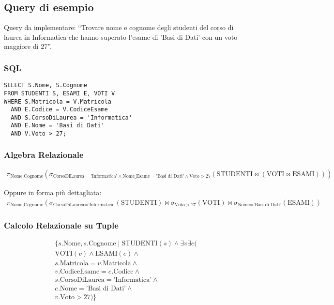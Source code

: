 \subsection{Query di esempio}
Query da implementare: ``Trovare nome e cognome degli studenti del corso di laurea in Informatica che hanno superato l'esame di 'Basi di Dati' con un voto maggiore di 27''.

\subsubsection{SQL}
\begin{verbatim}
SELECT S.Nome, S.Cognome
FROM STUDENTI S, ESAMI E, VOTI V
WHERE S.Matricola = V.Matricola
  AND E.Codice = V.CodiceEsame
  AND S.CorsoDiLaurea = 'Informatica'
  AND E.Nome = 'Basi di Dati'
  AND V.Voto > 27;
\end{verbatim}

\subsubsection{Algebra Relazionale}
\begin{align}
\pi_{\text{Nome}, \text{Cognome}} \left(
  \sigma_{\text{CorsoDiLaurea} = \text{'Informatica'} \wedge \text{Nome\_Esame} = \text{'Basi di Dati'} \wedge \text{Voto} > 27} \left(
    \text{STUDENTI} \bowtie (\text{VOTI} \bowtie \text{ESAMI})
  \right)
\right)
\end{align}

Oppure in forma più dettagliata:
\begin{align}
\pi_{\text{Nome}, \text{Cognome}} \left(
  \sigma_{\text{CorsoDiLaurea} = \text{'Informatica'}} (\text{STUDENTI}) \bowtie 
  \sigma_{\text{Voto} > 27} (\text{VOTI}) \bowtie 
  \sigma_{\text{Nome} = \text{'Basi di Dati'}} (\text{ESAMI})
\right)
\end{align}

\subsubsection{Calcolo Relazionale su Tuple}
\begin{align}
\{s.\text{Nome}, s.\text{Cognome} \mid \text{STUDENTI}(s) \wedge \exists v \exists e (\\
  \text{VOTI}(v) \wedge \text{ESAMI}(e) \wedge\\
  s.\text{Matricola} = v.\text{Matricola} \wedge\\
  v.\text{CodiceEsame} = e.\text{Codice} \wedge\\
  s.\text{CorsoDiLaurea} = \text{'Informatica'} \wedge\\
  e.\text{Nome} = \text{'Basi di Dati'} \wedge\\
  v.\text{Voto} > 27
)\}
\end{align}

